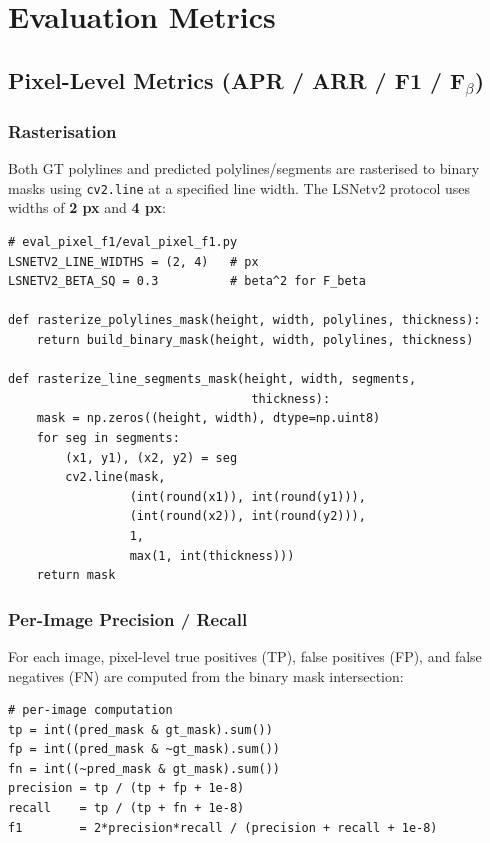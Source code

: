 \documentclass[11pt,a4paper]{article}
\begin{document}
\section{Evaluation Metrics}
\label{sec:metrics}

\subsection{Pixel-Level Metrics (APR / ARR / F1 / F$_\beta$)}
\label{subsec:pixel_metrics}

\subsubsection{Rasterisation}

Both GT polylines and predicted polylines/segments are rasterised to binary masks
using \texttt{cv2.line} at a specified line width.
The LSNetv2 protocol uses widths of \textbf{2 px} and \textbf{4 px}:

\begin{lstlisting}
# eval_pixel_f1/eval_pixel_f1.py
LSNETV2_LINE_WIDTHS = (2, 4)   # px
LSNETV2_BETA_SQ = 0.3          # beta^2 for F_beta

def rasterize_polylines_mask(height, width, polylines, thickness):
    return build_binary_mask(height, width, polylines, thickness)

def rasterize_line_segments_mask(height, width, segments,
                                  thickness):
    mask = np.zeros((height, width), dtype=np.uint8)
    for seg in segments:
        (x1, y1), (x2, y2) = seg
        cv2.line(mask,
                 (int(round(x1)), int(round(y1))),
                 (int(round(x2)), int(round(y2))),
                 1,
                 max(1, int(thickness)))
    return mask
\end{lstlisting}

\subsubsection{Per-Image Precision / Recall}

For each image, pixel-level true positives (TP), false positives (FP),
and false negatives (FN) are computed from the binary mask intersection:

\begin{lstlisting}
# per-image computation
tp = int((pred_mask & gt_mask).sum())
fp = int((pred_mask & ~gt_mask).sum())
fn = int((~pred_mask & gt_mask).sum())
precision = tp / (tp + fp + 1e-8)
recall    = tp / (tp + fn + 1e-8)
f1        = 2*precision*recall / (precision + recall + 1e-8)
\end{lstlisting}
\end{document}
